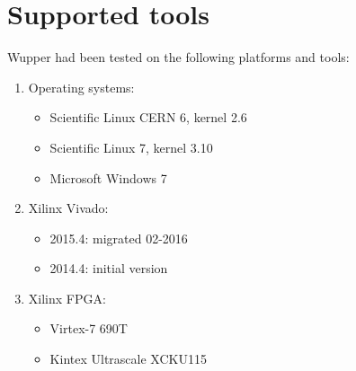 \section{Supported tools}
\label{sec:supported_tools}

Wupper had been tested on the following platforms and tools:

\begin{enumerate}
\item Operating systems: 
\begin{itemize}
\item Scientific Linux CERN 6, kernel 2.6
\item Scientific Linux 7, kernel 3.10
\item Microsoft Windows 7
\end{itemize}
\item Xilinx Vivado:
\begin{itemize}
\item 2015.4: migrated 02-2016
\item 2014.4: initial version
\end{itemize}
\item Xilinx FPGA:
\begin{itemize}
\item Virtex-7 690T
\item Kintex Ultrascale XCKU115
\end{itemize}
\end{enumerate}

\newpage